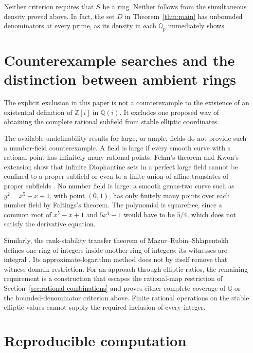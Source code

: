 \documentclass[11pt,a4paper]{article}
\theoremstyle{definition}
\newcommand{\Q}{\mathbb Q}\newcommand{\Z}{\mathbb Z}
\begin{document}
Neither criterion requires that $S$ be a ring. Neither follows from
the simultaneous density proved above. In fact, the set $D$ in
Theorem~\ref{thm:main} has unbounded denominators at every prime,
as its density in each $\Q_p$ immediately shows.

\section{Counterexample searches and the distinction between ambient rings}

The explicit exclusion in this paper is not a counterexample to
the existence of an existential definition of $\Z[i]$ in $\Q(i)$.
It excludes one proposed way of obtaining the complete rational
subfield from stable elliptic coordinates.

The available undefinability results for large, or ample, fields
do not provide such a number-field counterexample. A field is
large if every smooth curve with a rational point has infinitely
many rational points. Fehm's theorem and Kwon's extension show
that infinite Diophantine sets in a perfect large field cannot
be confined to a proper subfield or even to a finite union of
affine translates of proper subfields \cite{Fehm,Kwon}.
No number field is large: a smooth genus-two curve such as
$y^2=x^5-x+1$, with point $(0,1)$, has only finitely many points
over each number field by Faltings's theorem. The polynomial is
squarefree, since a common root of $x^5-x+1$ and $5x^4-1$
would have to be $5/4$, which does not satisfy the derivative
equation.

Similarly, the rank-stability transfer theorem of
Mazur--Rubin--Shlapentokh defines one ring of integers inside
another ring of integers; its witnesses are integral
\cite[Theorem 1.1 and Section 14]{MRS}. Its approximate-logarithm
method does not by itself remove that witness-domain restriction.
For an approach through elliptic ratios, the remaining requirement
is a construction that escapes the rational-map restriction of
Section~\ref{sec:rational-combinations} and proves either complete
coverage of $\Q$ or the bounded-denominator criterion above.
Finite rational operations on the stable elliptic values cannot
supply the required inclusion of every integer.

\section{Reproducible computation}
\end{document}
